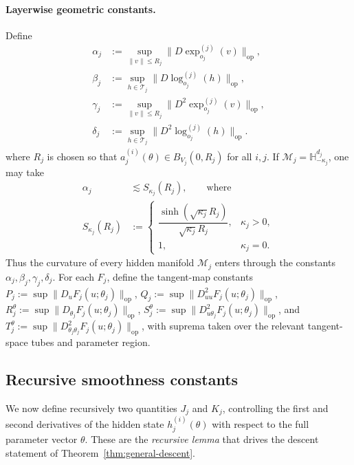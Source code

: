 \documentclass[letterpaper]{article}
\begin{document}
\paragraph{Layerwise geometric constants.}
Define
\[
\begin{aligned}
\alpha_j
&:=
\sup_{\|v\|\le R_j}
\|D\exp_{o_j}^{(j)}(v)\|_{\mathrm{op}},\\
\beta_j
&:=
\sup_{h\in \mathcal T_j}
\|D\log_{o_j}^{(j)}(h)\|_{\mathrm{op}},\\
\gamma_j
&:=
\sup_{\|v\|\le R_j}
\|D^2\exp_{o_j}^{(j)}(v)\|_{\mathrm{op}},\\
\delta_j
&:=
\sup_{h\in \mathcal T_j}
\|D^2\log_{o_j}^{(j)}(h)\|_{\mathrm{op}}.
\end{aligned}
\]
where \(R_j\) is chosen so that \(a_j^{(i)}(\theta)\in B_{V_j}(0,R_j)\) for
all \(i,j\). If \(\mathcal M_j=\mathbb H^{d_j}_{-\kappa_j}\), one may take
\[
\begin{aligned}
\alpha_j
&\lesssim
S_{\kappa_j}(R_j),
\qquad\text{where}\\
S_{\kappa_j}(R_j)
&:=
\begin{cases}
\dfrac{\sinh(\sqrt{\kappa_j}R_j)}
{\sqrt{\kappa_j}R_j}, & \kappa_j>0,\\[1.2em]
1, & \kappa_j=0.
\end{cases}
\end{aligned}
\]
Thus the curvature of every hidden manifold \(\mathcal M_j\) enters through
the constants \(\alpha_j,\beta_j,\gamma_j,\delta_j\). For each \(F_j\),
define the tangent-map constants
\(P_j := \sup\|D_uF_j(u;\theta_j)\|_{\mathrm{op}}\),
\(Q_j := \sup\|D^2_{uu}F_j(u;\theta_j)\|_{\mathrm{op}}\),
\(R_j^{\theta} := \sup\|D_{\theta_j}F_j(u;\theta_j)\|_{\mathrm{op}}\),
\(S_j^{\theta} := \sup\|D^2_{u\theta_j}F_j(u;\theta_j)\|_{\mathrm{op}}\),
and \(T_j^{\theta} := \sup\|D^2_{\theta_j\theta_j}F_j(u;\theta_j)\|_{\mathrm{op}}\),
with suprema taken over the relevant tangent-space tubes and parameter
region.

\subsection{Recursive smoothness constants}
\label{sec:prelim-recursive}

We now define recursively two quantities \(J_j\) and \(K_j\), controlling
the first and second derivatives of the hidden state \(h_j^{(i)}(\theta)\)
with respect to the full parameter vector \(\theta\). These are the
\emph{recursive lemma} that drives the descent statement of
Theorem~\ref{thm:general-descent}.
\end{document}
